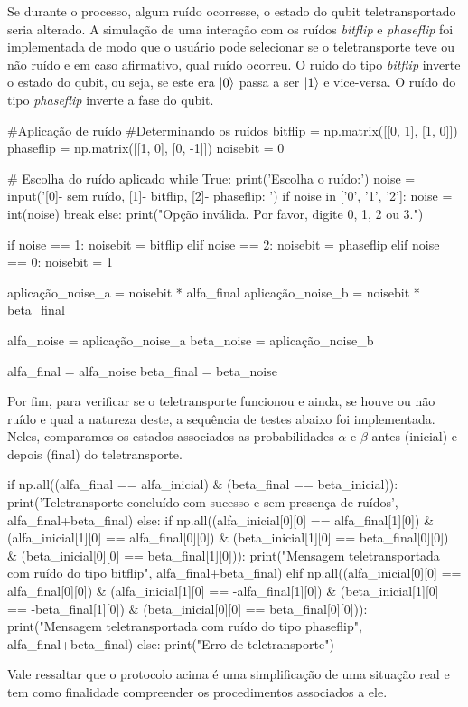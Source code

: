 Se durante o processo, algum ruído ocorresse, o estado do qubit teletransportado seria alterado. A simulação de uma interação com os ruídos \emph{bitflip} e \emph{phaseflip} foi implementada de modo que o usuário pode selecionar se o teletransporte teve ou não ruído e em caso afirmativo, qual ruído ocorreu. O ruído do tipo \emph{bitflip} inverte o estado do qubit, ou seja, se este era \(\ket{0}\) passa a ser \(\ket{1}\) e vice-versa. O ruído do tipo \emph{phaseflip} inverte a fase do qubit.

\begin{pycode}
    #Aplicação de ruído
    #Determinando os ruídos
    bitflip = np.matrix([[0, 1], [1, 0]])
    phaseflip = np.matrix([[1, 0], [0, -1]])
    noisebit = 0

    # Escolha do ruído aplicado
    while True:
        print('Escolha o ruído:')
        noise = input('[0]- sem ruído, [1]- bitflip, [2]- phaseflip: ')
        if noise in ['0', '1', '2']:
            noise = int(noise)
            break
        else:
            print("Opção inválida. Por favor, digite 0, 1, 2 ou 3.")

    if noise == 1:
        noisebit = bitflip
    elif noise == 2:
        noisebit = phaseflip
    elif noise == 0:
        noisebit = 1

    aplicação_noise_a = noisebit * alfa_final
    aplicação_noise_b = noisebit * beta_final

    alfa_noise = aplicação_noise_a
    beta_noise = aplicação_noise_b

    alfa_final = alfa_noise
    beta_final = beta_noise
\end{pycode}

Por fim, para verificar se o teletransporte funcionou e ainda, se houve ou não ruído e qual a natureza deste, a sequência de testes abaixo foi implementada. Neles, comparamos os estados associados as probabilidades \(\alpha\) e \(\beta\) antes (inicial) e depois (final) do teletransporte.

\begin{pycode}
    if np.all((alfa_final == alfa_inicial) & (beta_final == beta_inicial)):
        print('Teletransporte concluído com sucesso e sem presença de ruídos', alfa_final+beta_final)
    else:
        if np.all((alfa_inicial[0][0] == alfa_final[1][0]) &
                    (alfa_inicial[1][0] == alfa_final[0][0]) &
                    (beta_inicial[1][0] == beta_final[0][0]) &
                    (beta_inicial[0][0] == beta_final[1][0])):
            print("Mensagem teletransportada com ruído do tipo bitflip", alfa_final+beta_final)
        elif np.all((alfa_inicial[0][0] == alfa_final[0][0]) &
                    (alfa_inicial[1][0] == -alfa_final[1][0]) &
                    (beta_inicial[1][0] == -beta_final[1][0]) &
                    (beta_inicial[0][0] == beta_final[0][0])):
            print("Mensagem teletransportada com ruído do tipo phaseflip", alfa_final+beta_final)
        else:
            print("Erro de teletransporte")
\end{pycode}

Vale ressaltar que o protocolo acima é uma simplificação de uma situação real e tem como finalidade compreender os procedimentos associados a ele.

